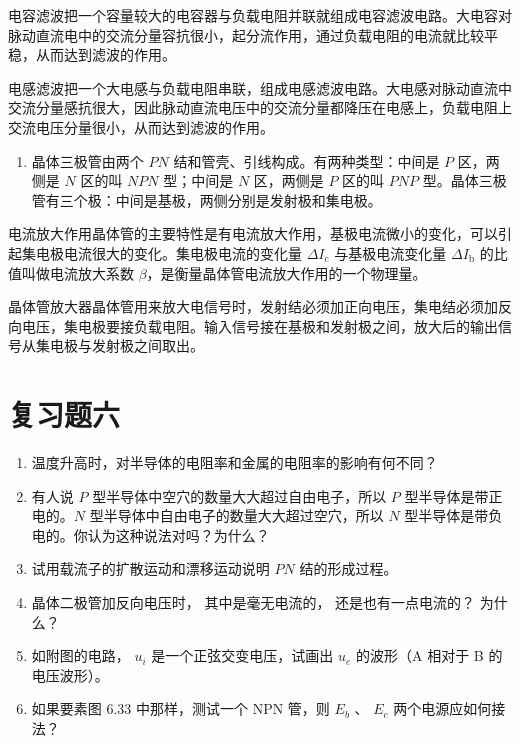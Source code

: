 电容滤波把一个容量较大的电容器与负载电阻并联就组成电容滤波电路。大电容对脉动直流电中的交流分量容抗很小，起分流作用，通过负载电阻的电流就比较平稳，从而达到滤波的作用。

电感滤波把一个大电感与负载电阻串联，组成电感滤波电路。大电感对脉动直流中交流分量感抗很大，因此脉动直流电压中的交流分量都降压在电感上，负载电阻上交流电压分量很小，从而达到滤波的作用。

\begin{enumerate}
\def\labelenumi{\arabic{enumi}.}
\setcounter{enumi}{5}
\tightlist
\item
  晶体三极管由两个 \(PN\) 结和管壳、引线构成。有两种类型：中间是 \(P\)
  区，两侧是 \(N\) 区的叫 \(NPN\) 型；中间是 \(N\) 区，两侧是 \(P\)
  区的叫 \(PNP\)
  型。晶体三极管有三个极：中间是基极，两侧分别是发射极和集电极。
\end{enumerate}

电流放大作用晶体管的主要特性是有电流放大作用，基极电流微小的变化，可以引起集电极电流很大的变化。集电极电流的变化量
\(\Delta I_{\mathrm{c}}\) 与基极电流变化量 \(\Delta I_{\mathrm{b}}\)
的比值叫做电流放大系数 \(\beta\)，是衡量晶体管电流放大作用的一个物理量。

晶体管放大器晶体管用来放大电信号时，发射结必须加正向电压，集电结必须加反向电压，集电极要接负载电阻。输入信号接在基极和发射极之间，放大后的输出信号从集电极与发射极之间取出。

\section{复习题六}\label{ux590dux4e60ux9898ux516d}

\begin{enumerate}
\def\labelenumi{\arabic{enumi}.}
\item
  温度升高时，对半导体的电阻率和金属的电阻率的影响有何不同？
\item
  有人说 \(P\) 型半导体中空穴的数量大大超过自由电子，所以 \(P\)
  型半导体是带正电的。\(N\) 型半导体中自由电子的数量大大超过空穴，所以
  \(N\) 型半导体是带负电的。你认为这种说法对吗？为什么？
\item
  试用载流子的扩散运动和漂移运动说明 \(PN\) 结的形成过程。
\item
  晶体二极管加反向电压时， 其中是毫无电流的， 还是也有一点电流的？
  为什么？
\item
  如附图的电路， \(u_{i}\) 是一个正弦交变电压，试画出 \(u_{e}\)
  的波形（A 相对于 B 的电压波形）。
\item
  如果要素图 6.33 中那样，测试一个 NPN 管，则 \(E_{b}\) 、 \(E_{c}\)
  两个电源应如何接法？
\end{enumerate}

